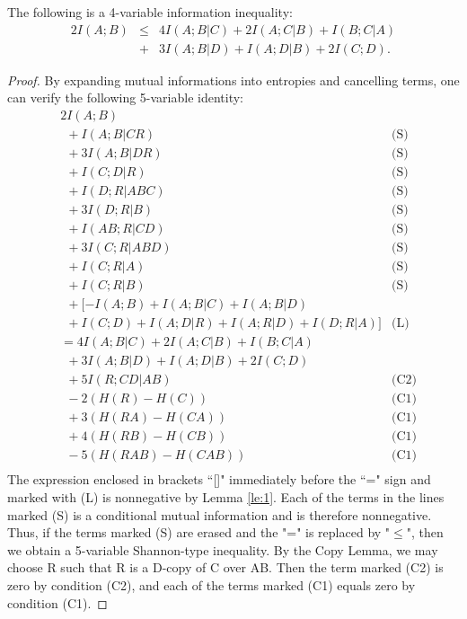 \documentclass[10pt,journal]{IEEEtran}
\begin{document}
\begin{theorem}
The following is a 4-variable information inequality:
\begin{eqnarray*}
   2I(A;B) &\leq& 4I(A;B|C)+2I(A;C|B)+I(B;C|A)\\
   &+&3I(A;B|D)+I(A;D|B)+2I(C;D).
\end{eqnarray*}
\end{theorem}
\begin{proof}
By expanding mutual informations into entropies and cancelling
terms, one can verify the following 5-variable identity:
\begin{align*}
 & 2I(A;B) & \\
      &\ \ + I(A;B|CR)   &   \text{(S)} \\
      &\ \ + 3I(A;B|DR)   &   \text{(S)} \\
     &\ \  + I(C;D|R)      &   \text{(S)} \\
     &\ \  + I(D;R|ABC)     &   \text{(S)} \\
     &\ \  + 3I(D;R|B)       &   \text{(S)} \\
     &\ \  + I(AB;R|CD)        &   \text{(S)} \\
     &\ \  + 3I(C;R|ABD)       &   \text{(S)} \\
     &\ \  + I(C;R|A)          &   \text{(S)} \\
     &\ \  + I(C;R|B)         &   \text{(S)} \\
     &\ \  + [-I(A;B)+I(A;B|C)+I(A;B|D) &\\
     &\ \ +I(C;D)+I(A;D|R)+I(A;R|D)+I(D;R|A)]    &   \text{(L)} \\
   & = 4I(A;B|C)+2I(A;C|B)+I(B;C|A) \\
    &\ \ +3I(A;B|D)+I(A;D|B)+2I(C;D) \\
     &\ \  + 5I(R;CD|AB)     &   \text{(C2)} \\
    &\ \   - 2(H(R)-H(C))    &   \text{(C1)} \\
    &\ \   + 3(H(RA)-H(CA))  &   \text{(C1)} \\
     &\ \  + 4(H(RB)-H(CB))   &   \text{(C1)} \\
     &\ \  - 5(H(RAB)-H(CAB)) &   \text{(C1)} \\
\end{align*}
The expression enclosed in brackets ``[]" immediately before the ``=" sign
and marked with (L) is nonnegative by Lemma \ref{le:1}.
Each of the terms in the lines marked (S) is a conditional mutual
information and is therefore nonnegative.  Thus, if the terms marked (S)
are erased and the "=" is replaced by "$\le$", then we obtain a 5-variable
Shannon-type inequality.  By the Copy Lemma, we may choose R such
that R is a D-copy of C over AB.  Then the term marked (C2) is zero
by condition (C2), and each of the terms marked (C1) equals zero
by condition (C1).
\end{proof}
\end{document}
